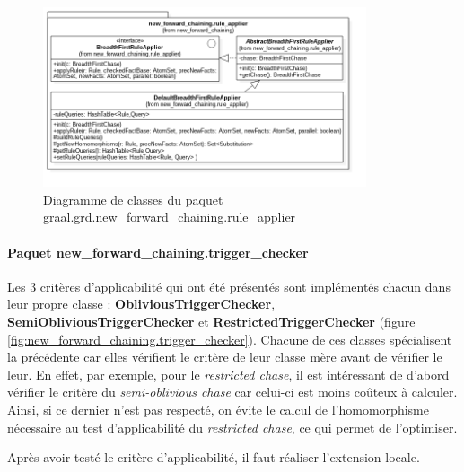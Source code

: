        \begin{figure}[h]
        \centering
        \includegraphics[width=0.85\textwidth]{pictures/new_forward_chaining-rule_applier.png}
        \vspace{-30pt}
        \caption{Diagramme de classes du paquet graal.grd.new\_forward\_chaining.rule\_applier}
        \label{fig:new_forward_chaining.rule_applier}
        \vspace{-10pt}
        \end{figure}
       
       \paragraph{Paquet new\_forward\_chaining.trigger\_checker} Les 3 critères d'applicabilité qui ont été présentés sont implémentés chacun dans leur propre classe : \textbf{ObliviousTriggerChecker}, \textbf{SemiObliviousTriggerChecker} et \textbf{RestrictedTriggerChecker} (figure \ref{fig:new_forward_chaining.trigger_checker}). Chacune de ces classes spécialisent la précédente car elles vérifient le critère de leur classe mère avant de vérifier le leur. En effet, par exemple, pour le \textit{restricted chase}, il est intéressant de d'abord vérifier le critère du \textit{semi-oblivious chase} car celui-ci est moins coûteux à calculer. Ainsi, si ce dernier n'est pas respecté, on évite le calcul de l'homomorphisme nécessaire au test d'applicabilité du \textit{restricted chase}, ce qui permet de l'optimiser. 
       \par Après avoir testé le critère d'applicabilité, il faut réaliser l'extension locale.
       
